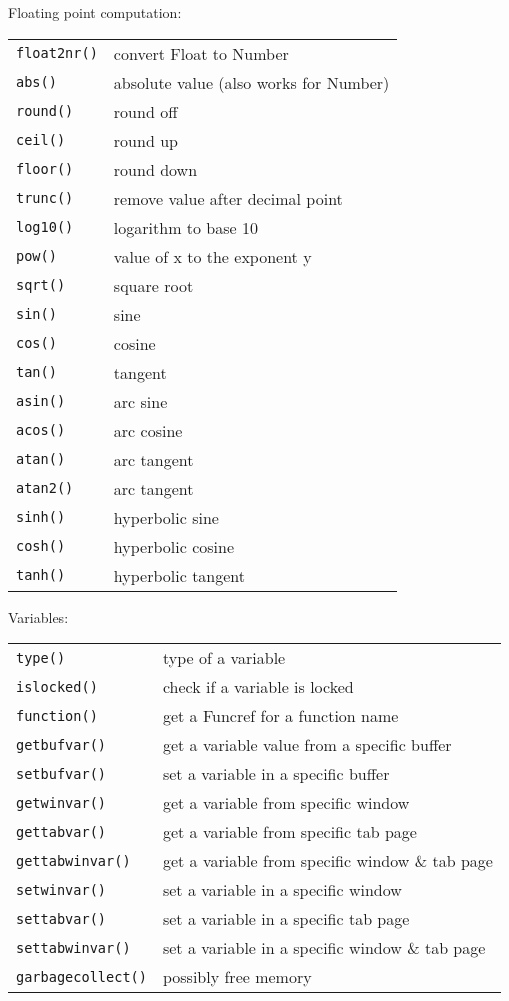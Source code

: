 Floating point computation:
\label{float-functions}
\begin{center} \begin{tabular}{l l}
				\verb!float2nr()! & convert Float to Number \\
				\verb!abs()! & absolute value (also works for Number) \\
				\verb!round()! & round off \\
				\verb!ceil()! & round up \\
				\verb!floor()! & round down \\
				\verb!trunc()! & remove value after decimal point \\
				\verb!log10()! & logarithm to base 10 \\
				\verb!pow()! & value of x to the exponent y \\
				\verb!sqrt()! & square root \\
				\verb!sin()! & sine \\
				\verb!cos()! & cosine \\
				\verb!tan()! & tangent \\
				\verb!asin()! & arc sine \\
				\verb!acos()! & arc cosine \\
				\verb!atan()! & arc tangent \\
				\verb!atan2()! & arc tangent \\
				\verb!sinh()! & hyperbolic sine \\
				\verb!cosh()! & hyperbolic cosine \\
				\verb!tanh()! & hyperbolic tangent \\
\end{tabular} \end{center}

Variables:
\label{var-functions}
\begin{center} \begin{tabular}{l l}
				\verb!type()! & type of a variable \\
				\verb!islocked()! & check if a variable is locked \\
				\verb!function()! & get a Funcref for a function name \\
				\verb!getbufvar()! & get a variable value from a specific buffer \\
				\verb!setbufvar()! & set a variable in a specific buffer \\
				\verb!getwinvar()! & get a variable from specific window \\
				\verb!gettabvar()! & get a variable from specific tab page \\
				\verb!gettabwinvar()! & get a variable from specific window \& tab page \\
				\verb!setwinvar()! & set a variable in a specific window \\
				\verb!settabvar()! & set a variable in a specific tab page \\
				\verb!settabwinvar()! & set a variable in a specific window \& tab page \\
				\verb!garbagecollect()! & possibly free memory \\
\end{tabular} \end{center}

